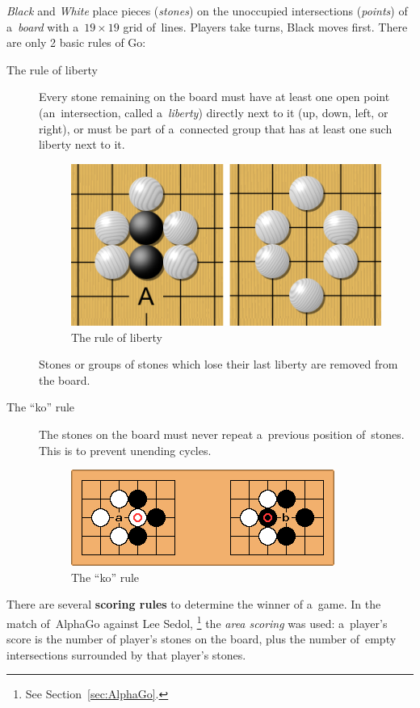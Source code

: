 \emph{Black} and \emph{White} place pieces (\emph{stones}) on the unoccupied intersections (\emph{points}) of a~\emph{board} with a~$19\times19$ grid of~lines.
Players take turns, Black moves first.
There are only 2 basic rules of Go:
\begin{description}
  \item [The rule of liberty]
    Every stone remaining on the board must have at least one open point (an~intersection, called a~\emph{liberty}) directly next to it (up, down, left, or right), or must be part of a~connected group that has at least one such liberty next to it.
    \begin{figure}[H]
      \centering
      \includegraphics[width=.5\textwidth]{../img/Go_rule_of_liberty.png}
      \caption{The rule of liberty}
      \label{fig:Go-rule-liberty}
    \end{figure}

    Stones or groups of stones which lose their last liberty are removed from the board.

  \item [The ``ko'' rule]
    The stones on the board must never repeat a~previous position of~stones.
    This is to prevent unending cycles.
    \begin{figure}[H]
      \centering
      \includegraphics[width=.5\textwidth]{../img/Go_ko_rule.png}
      \caption{The ``ko'' rule}
      \label{fig:Go-Ko-rule}
    \end{figure}

\end{description}

There are several \textbf{scoring rules} to determine the winner of a~game.
In the match of~AlphaGo against Lee Sedol,%
\footnote{See Section~\ref{sec:AlphaGo}.}
the \emph{area scoring} was used:
a~player's score is the number of player's stones on the board, plus the number of~empty intersections surrounded by that player's stones.

